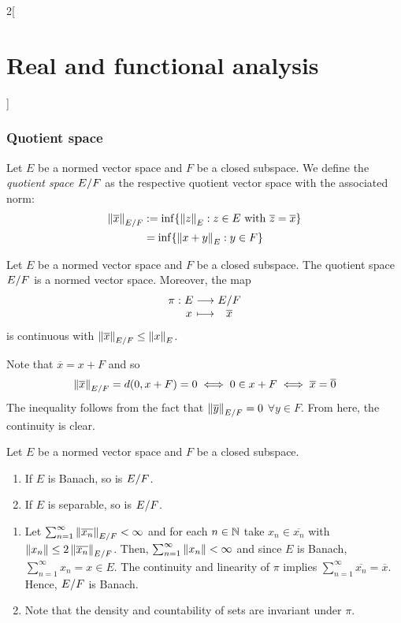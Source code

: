 \documentclass[../../../main_math.tex]{subfiles}
\begin{document}
\begin{multicols}{2}[\section{Real and functional analysis}]
  \subsubsection{Quotient space}
  \begin{definition}
    Let $E$ be a normed vector space and $F$ be a closed subspace. We define the \emph{quotient space} $\quot{E}{F}$ as the respective quotient vector space with the associated norm:
    \begin{align*}
      \norm{\overline{x}}_{\quot{E}{F}} & :=\inf\{\norm{z}_E:z\in E\text{ with }\overline{z} = \overline{x}\} \\
                                        & =\inf\{\norm{x+y}_E:y\in F\}
    \end{align*}
  \end{definition}
  \begin{proposition}
    Let $E$ be a normed vector space and $F$ be a closed subspace. The quotient space $\quot{E}{F}$ is a normed vector space. Moreover, the map $$\function{\pi}{E}{\quot{E}{F}}{x}{\overline{x}}$$ is continuous with $\norm{\overline{x}}_{\quot{E}{F}}\leq \norm{x}_E$.
  \end{proposition}
  \begin{sproof}
    Note that $\overline{x}=x+F$ and so $$\norm{\overline{x}}_{\quot{E}{F}}=d(0,x+F)=0\iff 0\in x+ F\iff \overline{x}=\overline{0}$$
    The inequality follows from the fact that $\norm{\overline{y}}_{\quot{E}{F}}=0$ $\forall y\in F$. From here, the continuity is clear.
  \end{sproof}
  \begin{lemma}
    Let $E$ be a normed vector space and $F$ be a closed subspace.
    \begin{enumerate}
      \item If $E$ is Banach, so is $\quot{E}{F}$.
      \item If $E$ is separable, so is $\quot{E}{F}$.
    \end{enumerate}
  \end{lemma}
  \begin{sproof}
    \begin{enumerate}
      \item Let $\sum_{n=1}^\infty\norm{\overline{x_n}}_{\quot{E}{F}}<\infty$ and for each $n\in\mathbb{N}$ take $x_n\in\overline{x_n}$ with $\norm{x_n}\leq 2\norm{\overline{x_n}}_{\quot{E}{F}}$. Then, $\sum_{n=1}^\infty\left\|x_n\right\|<\infty$ and since $E$ is Banach, $\sum_{n=1}^\infty x_n=x\in E$. The continuity and linearity of $\pi$ implies $\sum_{n=1}^\infty \overline{x_n}=\overline{x}$. Hence, $\quot{E}{F}$ is Banach.
      \item Note that the density and countability of sets are invariant under $\pi$.
    \end{enumerate}
  \end{sproof}

\end{multicols}
\end{document}
